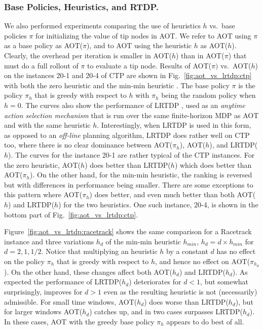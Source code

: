 \documentclass[letterpaper]{article}
\begin{document}
\subsubsection{Base Policies,  Heuristics, and RTDP.}
We also performed experiments comparing the use of heuristics $h$
vs.\ base policies $\pi$ for initializing the value of tip nodes in
AOT. We  refer to AOT using $\pi$ as a base policy as AOT($\pi$),
and to  AOT using the heuristic $h$ as AOT($h$).
Clearly, the overhead per iteration is smaller in AOT($h$) than in AOT($\pi$)
that must do a full rollout of $\pi$ to evaluate a tip node.
Results of AOT($\pi)$ vs.\ AOT($h$) on the instances 20-1 and 20-4 of CTP are shown
in Fig.~\ref{fig:aot_vs_lrtdp:ctp} with both the zero heuristic and the min-min heuristic
\cite{bonet:lrtdp}. The base policy $\pi$  is the policy $\pi_h$
that is greedy with respect to $h$ with $\pi_h$ being the random policy when $h=0$.
The curves also show the performance of LRTDP \cite{bonet:lrtdp},  used as an
\emph{anytime action selection mechanism} that is run over the same finite-horizon MDP as AOT
and with the same heuristic $h$. Interestingly, when LRTDP is used in this form,
as opposed to an \emph{off-line} planning algorithm, LRTDP does rather well on CTP too,
where there is no clear dominance  between AOT($\pi_h$), AOT($h$), and LRTDP($h$).
The curves for the instance 20-1 are rather typical of the CTP instances.
For the zero heuristic, AOT($h$) does  better  than LRTDP($h$) which does better
 than AOT($\pi_h$). On the other hand, for the min-min heuristic, the ranking
 is  reversed but with differences in performance being smaller.
There are  some exceptions to this pattern where AOT($\pi_h$) does
better, and even much better than  both  AOT($h$) and LRTDP($h$) for the two heuristics.
One such instance, 20-4, is shown in the bottom part of  Fig.~\ref{fig:aot_vs_lrtdp:ctp}.

Figure~\ref{fig:aot_vs_lrtdp:racetrack} shows the same  comparison for
a Racetrack instance and three variations $h_d$ of the min-min heuristic
$h_{min}$, $h_d = d \times h_{min}$ for $d=2,1,1/2$. Notice that multiplying
an heuristic $h$ by a constant $d$ has no effect on the policy $\pi_h$
that is greedy with respect to  $h$, and hence no effect on AOT($\pi_{h_d}$).
On the other hand, these changes  affect both AOT($h_d$) and LRTDP($h_d$).
As expected the performance of LRTDP($h_d$) deteriorates  for  $d < 1$,
but somewhat surprisingly,  improves for $d > 1$ even as the resulting heuristic
is not (necessarily) admissible.   For small time windows, AOT($h_d$) does worse than LRTDP($h_d$),
but for larger   windows AOT($h_d$) catches up,  and in two cases surpasses  LRTDP($h_d$).
In these cases, AOT with the greedy  base policy $\pi_h$ appears to do  best of all.
\end{document}

